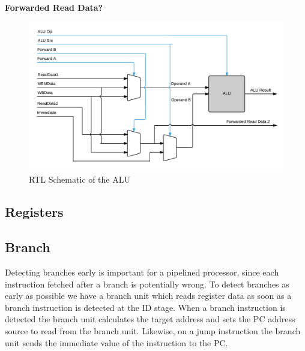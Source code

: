 \textbf{Forwarded Read Data?}


\begin{figure}[h!]
    \includegraphics[width=\linewidth]{img/ALU.png}
    \caption{RTL Schematic of the ALU}
    \label{fig:ALU}
\end{figure}

\subsection{Registers}

\subsection{Branch}
Detecting branches early is important for a pipelined processor, since each instruction fetched after a branch is potentially wrong.
To detect branches as early as possible we have a branch unit which reads register data as soon as a branch instruction is detected at the ID stage.
When a branch instruction is detected the branch unit calculates the target address and sets the PC address source to read from the branch unit.
Likewise, on a jump instruction the branch unit sends the immediate value of the instruction to the PC.

